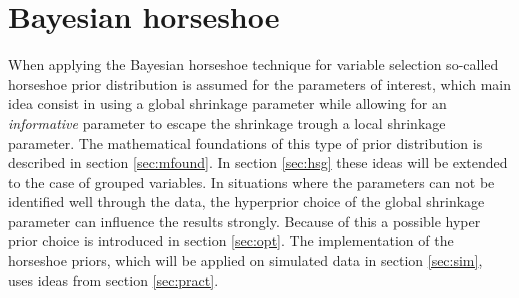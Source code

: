 \documentclass[12pt,letterpaper]{article}
\numberwithin{equation}{subsection}
\begin{document}
\section{Bayesian horseshoe}
\label{sec:hs}
When applying the Bayesian horseshoe technique for variable selection so-called horseshoe prior distribution is assumed for the parameters of interest, which main idea consist in using a global shrinkage parameter while allowing for an \textit{informative} parameter to escape the shrinkage trough a local shrinkage parameter. The mathematical foundations of this type of prior distribution is described in section \ref{sec:mfound}. In section \ref{sec:hsg} these ideas will be extended to the case of grouped variables. In situations where the parameters can not be identified well through the data, the hyperprior choice of the global shrinkage parameter can influence the results strongly. Because of this a possible hyper prior choice is introduced in section \ref{sec:opt}. The implementation of the horseshoe priors, which will be applied on simulated data in section \ref{sec:sim}, uses ideas from section \ref{sec:pract}.
\end{document}

